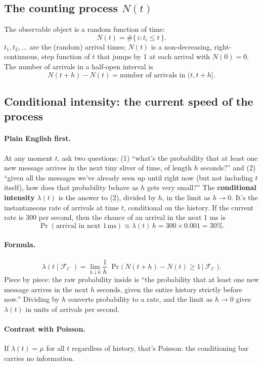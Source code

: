 \subsection{The counting process $N(t)$}
\label{app:pp-counting}

The observable object is a random function of time:
$$N(t) = \#\{\, i : t_i \leq t \,\}.$$
$t_1, t_2, \ldots$ are the (random) arrival times; $N(t)$ is a non-decreasing, right-continuous, step function of $t$ that jumps by 1 at each arrival with $N(0) = 0$. The number of arrivals in a half-open interval is
$$N(t + h) - N(t) = \text{number of arrivals in }(t, t + h].$$

\subsection{Conditional intensity: the current speed of the process}
\label{app:pp-intensity}

\paragraph{Plain English first.} At any moment $t$, ask two questions: (1) ``what's the probability that at least one new message arrives in the next tiny sliver of time, of length $h$ seconds?'' and (2) ``given all the messages we've already seen up until right now (but not including $t$ itself), how does that probability behave as $h$ gets very small?'' The \textbf{conditional intensity} $\lambda(t)$ is the answer to (2), divided by $h$, in the limit as $h \to 0$. It's the instantaneous rate of arrivals at time $t$, conditional on the history. If the current rate is 300 per second, then the chance of an arrival in the next 1 ms is
$$\Pr(\text{arrival in next }1\,\mathrm{ms}) \approx \lambda(t)\, h = 300 \times 0.001 = 30\%.$$

\paragraph{Formula.}
$$\lambda(t \mid \mathcal{F}_{t^-}) = \lim_{h \downarrow 0} \frac{1}{h}\; \Pr\!\big(\, N(t + h) - N(t) \geq 1 \,\big|\, \mathcal{F}_{t^-} \big).$$
Piece by piece: the raw probability inside is ``the probability that at least one new message arrives in the next $h$ seconds, given the entire history strictly before now.'' Dividing by $h$ converts probability to a rate, and the limit as $h \to 0$ gives $\lambda(t)$ in units of arrivals per second.

\paragraph{Contrast with Poisson.} If $\lambda(t) = \mu$ for all $t$ regardless of history, that's Poisson: the conditioning bar carries no information.


